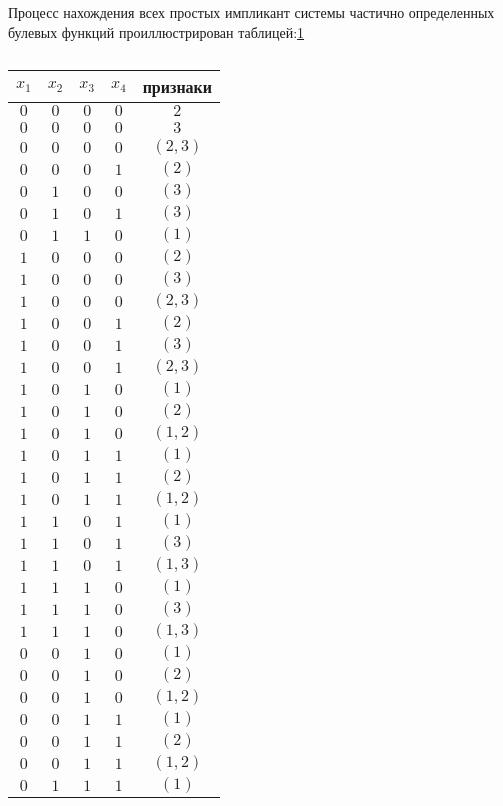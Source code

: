 \documentclass[12pt,a4paper]{article}
\begin{document}
\begin{table}[h!]
Процесс нахождения всех простых импликант системы частично определенных булевых функций проиллюстрирован таблицей:\ref{lb5}


\caption{\label{lb5}}
	\begin{tabular}{|c|c|c|c||c|}
		
		\hline
		$x_1$ & $x_2$ & $x_3$ & $x_4$ & признаки  \\
		\hline		
		
$0$ & $0$ & $0$ & $0$ & $2$ \\
\hline
$0$ & $0$ & $0$ & $0$ &  $3$ \\
\hline
$0$ & $0$ & $0$ & $0$ & $(2,3)$ \\
\hline
$0$ & $0$ & $0$ & $1$ & $(2)$ \\
\hline
$0$ & $1$ & $0$ & $0$ &  $(3)$ \\
\hline
$0$ & $1$ & $0$ & $1$ & $(3)$ \\
\hline
$0$ & $1$ & $1$ & $0$ & $(1)$  \\
\hline
$1$ & $0$ & $0$ & $0$ & $(2)$  \\
\hline
$1$ & $0$ & $0$ & $0$ &  $(3)$ \\
\hline
$1$ & $0$ & $0$ & $0$ &  $(2,3)$ \\
\hline
$1$ & $0$ & $0$ & $1$ & $(2)$  \\
\hline
$1$ & $0$ & $0$ & $1$ & $(3)$ \\
\hline
$1$ & $0$ & $0$ & $1$ & $(2,3)$ \\
\hline
$1$ & $0$ & $1$ & $0$ & $(1)$  \\
\hline
$1$ & $0$ & $1$ & $0$ &  $(2)$  \\
\hline
$1$ & $0$ & $1$ & $0$ & $(1,2)$  \\
\hline
$1$ & $0$ & $1$ & $1$ & $(1)$  \\
\hline
$1$ & $0$ & $1$ & $1$ &  $(2)$  \\
\hline
$1$ & $0$ & $1$ & $1$ & $(1,2)$  \\
\hline
$1$ & $1$ & $0$ & $1$ & $(1)$  \\
\hline
$1$ & $1$ & $0$ & $1$ &  $(3)$ \\
\hline
$1$ & $1$ & $0$ & $1$ & $(1,3)$ \\
\hline
$1$ & $1$ & $1$ & $0$ & $(1)$  \\
\hline
$1$ & $1$ & $1$ & $0$ &  $(3)$ \\
\hline
$1$ & $1$ & $1$ & $0$ & $(1,3)$ \\
\hline
$0$ & $0$ & $1$ & $0$ & $(1)$  \\
\hline
$0$ & $0$ & $1$ & $0$ & $(2)$ \\
\hline
$0$ & $0$ & $1$ & $0$ & $(1,2)$ \\
\hline
$0$ & $0$ & $1$ & $1$ & $(1)$  \\
\hline
$0$ & $0$ & $1$ & $1$ & $(2)$  \\
\hline
$0$ & $0$ & $1$ & $1$ & $(1,2)$  \\
\hline
$0$ & $1$ & $1$ & $1$ & $(1)$  \\
\hline


\end{tabular}
\end{table}
\end{document}
